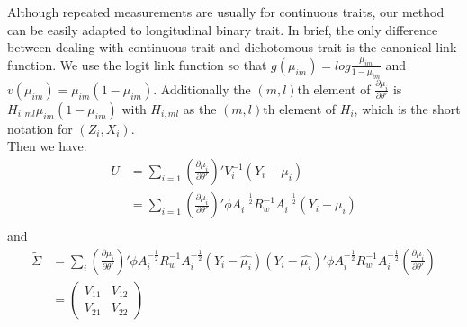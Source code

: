 \documentclass[12pt]{article}
\begin{document}
Although repeated measurements are usually for continuous traits, our method can be easily adapted to longitudinal binary trait. In brief, the only difference between dealing with continuous trait and dichotomous trait is the canonical link function.
We use the logit link function so that $g(\mu_{im}) = log \frac{\mu_{im}}{1 - \mu_{im}}$ and $v(\mu_{im}) = \mu_{im} (1 - \mu_{im})$. Additionally the $(m, l)$th element of $\frac{\partial\mu_{i}}{\partial\theta'}$ is
$
H_{i,ml} \mu_{im} (1- \mu_{im})
$
with $H_{i,ml}$ as the $(m, l)$th element of $H_i$, which is the short notation for $(Z_{i},X_{i})$.\\
Then we have:
\begin{align*}
U & = \sum_{i=1} (\frac{\partial\mu_{i}}{\partial\theta'})' V_i^{-1} (Y_{i}-\mu_{i})\\
& = \sum_{i=1} (\frac{\partial\mu_{i}}{\partial\theta'})' \phi A_{i}^{-\frac{1}{2}} R_{w}^{-1} A_{i}^{-\frac{1}{2}} (Y_{i}-\mu_{i})\\
\end{align*}
and
\begin{align*}
\widetilde{\Sigma} & = \sum_{i}\left(\frac{\partial\mu_{i}}{\partial\theta'}\right)' \phi A_{i}^{-\frac{1}{2}} R_{w}^{-1} A_{i}^{-\frac{1}{2}} (Y_{i}-\hat{\mu_{i}}) (Y_{i}-\hat{\mu_{i}})' \phi A_{i}^{-\frac{1}{2}} R_{w}^{-1} A_{i}^{-\frac{1}{2}} \left( \frac{\partial\mu_{i}}{\partial\theta'} \right)\\
& = 
\begin{pmatrix}
V_{11} & V_{12}\\
 V_{21} & V_{22}
\end{pmatrix}
\end{align*}
\end{document}
